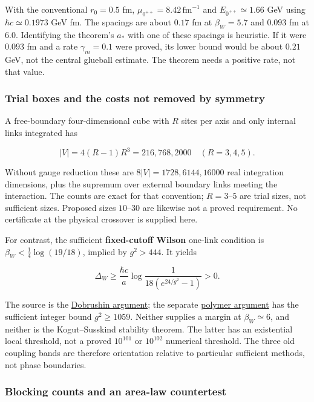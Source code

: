\documentclass[11pt,a4paper]{article}
\begin{document}
With the conventional \(r_0=0.5\) fm,
\(\mu_{0^{++}}=8.42\,\mathrm{fm}^{-1}\) and \(E_{0^{++}}\simeq1.66\) GeV
using \(\hbar c\simeq0.1973\) GeV fm. The spacings are about \(0.17\) fm
at \(\beta_W=5.7\) and \(0.093\) fm at \(6.0\). Identifying the
theorem's \(a_*\) with one of these spacings is heuristic. If it were
\(0.093\) fm and a rate \(\gamma_m=0.1\) were proved, its lower bound
would be about \(0.21\) GeV, not the central glueball estimate. The
theorem needs a positive rate, not that value.

\hypertarget{trial-boxes-and-the-costs-not-removed-by-symmetry}{%
\subsubsection{Trial boxes and the costs not removed by
symmetry}\label{trial-boxes-and-the-costs-not-removed-by-symmetry}}

A free-boundary four-dimensional cube with \(R\) sites per axis and only
internal links integrated has

\[|V|=4(R-1)R^3=216,768,2000\quad(R=3,4,5).\]

Without gauge reduction these are \(8|V|=1728,6144,16000\) real
integration dimensions, plus the supremum over external boundary links
meeting the interaction. The counts are exact for that convention;
\(R=3\)--\(5\) are trial sizes, not sufficient sizes. Proposed sizes
\(10\)--\(30\) are likewise not a proved requirement. No certificate at
the physical crossover is supplied here.

For contrast, the sufficient \textbf{fixed-cutoff Wilson} one-link
condition is \(\beta_W<\tfrac14\log(19/18)\), implied by \(g^2>444\). It
yields

\[\Delta_W\ge\frac{\hbar c}{a}
 \log\frac1{18(e^{24/g^2}-1)}>0.\]

The source is the \href{dobrushin-uniqueness-wilson.md}{Dobrushin
argument}; the separate
\href{wilson-strong-coupling-explicit.md}{polymer argument} has the
sufficient integer bound \(g^2\ge1059\). Neither supplies a margin at
\(\beta_W\simeq6\), and neither is the Kogut--Susskind stability
theorem. The latter has an existential local threshold, not a proved
\(10^{101}\) or \(10^{102}\) numerical threshold. The three old coupling
bands are therefore orientation relative to particular sufficient
methods, not phase boundaries.

\hypertarget{blocking-counts-and-an-area-law-countertest}{%
\subsubsection{Blocking counts and an area-law
countertest}\label{blocking-counts-and-an-area-law-countertest}}
\end{document}

